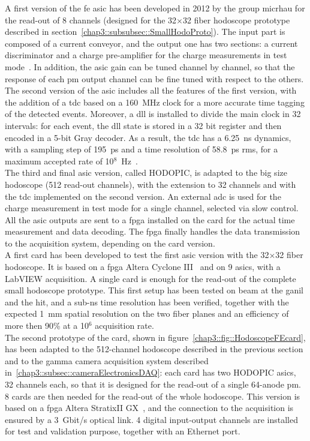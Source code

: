A first version of the \gls{fe} \gls{asic} has been developed in 2012 by the group \gls{micrhau} for the read-out of 8 channels (designed for the 32$\times$32 fiber hodoscope prototype described in section~\ref{chap3::subsubsec::SmallHodoProto}). The input part is composed of a current conveyor, and the output one has two sections: a current discriminator and a charge pre-amplifier for the charge measurements in test mode~\parencite{Deng2012, Deng2013}. In addition, the \gls{asic} gain can be tuned channel by channel, so that the response of each \gls{pm} output channel can be fine tuned with respect to the others.\\
The second version of the \gls{asic} includes all the features of the first version, with the addition of a \gls{tdc} based on a 160~MHz clock for a more accurate time tagging of the detected events. Moreover, a \gls{dll} is installed to divide the main clock in 32 intervals: for each event, the \gls{dll} state is stored in a 32 bit register and then encoded in a 5-bit Gray decoder. As a result, the \gls{tdc} has a 6.25~ns dynamics, with a sampling step of 195~ps and a time resolution of 58.8~ps \gls{rms}, for a maximum accepted rate of 10$^{8}$~Hz~\parencite{Deng2012b}.\\
The third and final \gls{asic} version, called HODOPIC, is adapted to the big size hodoscope (512 read-out channels), with the extension to 32 channels and with the \gls{tdc} implemented on the second version. An external \gls{adc} is used for the charge measurement in test mode for a single channel, selected via slow control. All the \gls{asic} outputs are sent to a \gls{fpga} installed on the card for the actual time measurement and data decoding. The \gls{fpga} finally handles the data transmission to the acquisition system, depending on the card version.\\
A first card has been developed to test the first \gls{asic} version with the 32$\times$32 fiber hodoscope. It is based on a \gls{fpga} Altera Cyclone III~\parencite{Altera2012} and on 9 \glspl{asic}, with a LabVIEW acquisition. A single card is enough for the read-out of the complete small hodoscope prototype. This first setup has been tested on beam at the \gls{ganil} and the \gls{hit}, and a sub-ns time resolution has been verified, together with the expected 1~mm spatial resolution on the two fiber planes and an efficiency of more then 90\% at a 10$^{6}$ acquisition rate.\\
The second prototype of the card, shown in figure~\ref{chap3::fig::HodoscopeFEcard}, has been adapted to the 512-channel hodoscope described in the previous section and to the gamma camera acquisition system described in~\ref{chap3::subsec::cameraElectronicsDAQ}: each card has two HODOPIC \glspl{asic}, 32 channels each, so that it is designed for the read-out of a single 64-anode \gls{pm}. 8 cards are then needed for the read-out of the whole hodoscope. This version is based on a \gls{fpga} Altera StratixII GX~\parencite{Altera2009}, and the connection to the acquisition is ensured by a 3~Gbit/s optical link. 4 digital input-output channels are installed for test and validation purpose, together with an Ethernet port.\\
